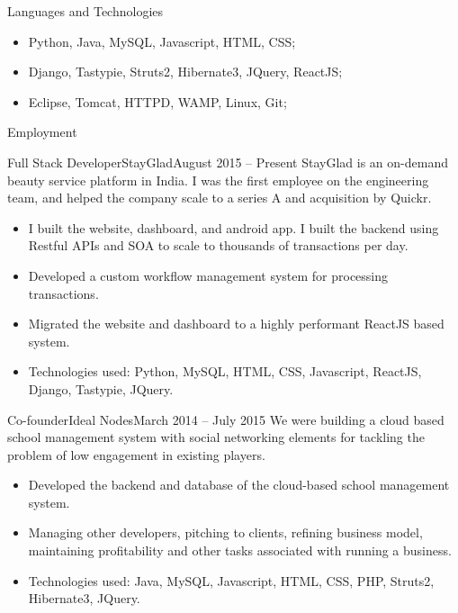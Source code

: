 \documentclass[]{mcdowellcv}
\begin{document}
	\makeheader

	\begin{cvsection}{Languages and Technologies}
		\begin{cvsubsection}{}{}{}	
			\begin{itemize}
				\item Python, Java, MySQL, Javascript, HTML, CSS;
				\item Django, Tastypie, Struts2, Hibernate3, JQuery, ReactJS;
				\item Eclipse, Tomcat, HTTPD, WAMP, Linux, Git;
			\end{itemize}
		\end{cvsubsection}
	\end{cvsection}
	
	\begin{cvsection}{Employment}
		\begin{cvsubsection}{Full Stack Developer}{StayGlad}{August 2015 – Present}
			StayGlad is an on-demand beauty service platform in India. I was the first employee on the engineering team, and helped the company scale to a series A and acquisition by Quickr.
			\begin{itemize}
				\item I built the website, dashboard, and android app. I built the backend using Restful APIs and SOA to scale to thousands of transactions per day.
				\item Developed a custom workflow management system for processing transactions.
				\item Migrated the website and dashboard to a highly performant ReactJS based system.
				\item Technologies used: Python, MySQL, HTML, CSS, Javascript, ReactJS, Django, Tastypie, JQuery.
			\end{itemize}
		\end{cvsubsection}
		
		\begin{cvsubsection}{Co-founder}{Ideal Nodes}{March 2014 – July 2015}	
			We were building a cloud based school management system with social networking elements for tackling the problem of low engagement in existing players.
			\begin{itemize}
				\item Developed the backend and database of the cloud-based school management system.
				\item Managing other developers, pitching to clients, refining business model, maintaining profitability and other tasks associated with running a business.
				\item Technologies used: Java, MySQL, Javascript, HTML, CSS, PHP, Struts2, Hibernate3, JQuery.
			\end{itemize}
		\end{cvsubsection}
		

\end{cvsection}
\end{document}
